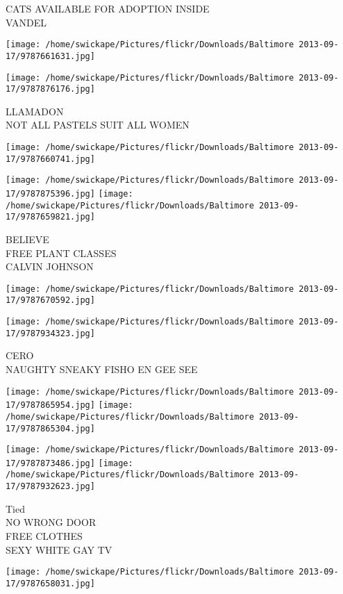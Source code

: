 \documentclass[10pt,letterpaper]{article}
\begin{document}
CATS AVAILABLE FOR ADOPTION INSIDE\\
VANDEL
\pagebreak

\texttt{[image: /home/swickape/Pictures/flickr/Downloads/Baltimore 2013-09-17/9787661631.jpg]}

\vspace{0.25in}
\texttt{[image: /home/swickape/Pictures/flickr/Downloads/Baltimore 2013-09-17/9787876176.jpg]}

LLAMADON\\
NOT ALL PASTELS SUIT ALL WOMEN
\pagebreak

\texttt{[image: /home/swickape/Pictures/flickr/Downloads/Baltimore 2013-09-17/9787660741.jpg]}

\vspace{0.25in}
\texttt{[image: /home/swickape/Pictures/flickr/Downloads/Baltimore 2013-09-17/9787875396.jpg]}
\texttt{[image: /home/swickape/Pictures/flickr/Downloads/Baltimore 2013-09-17/9787659821.jpg]}

BELIEVE\\
FREE PLANT CLASSES\\
CALVIN JOHNSON
\pagebreak

\texttt{[image: /home/swickape/Pictures/flickr/Downloads/Baltimore 2013-09-17/9787670592.jpg]}

\vspace{0.25in}
\texttt{[image: /home/swickape/Pictures/flickr/Downloads/Baltimore 2013-09-17/9787934323.jpg]}

CERO\\
NAUGHTY SNEAKY FISHO EN GEE SEE
\pagebreak

\texttt{[image: /home/swickape/Pictures/flickr/Downloads/Baltimore 2013-09-17/9787865954.jpg]}
\texttt{[image: /home/swickape/Pictures/flickr/Downloads/Baltimore 2013-09-17/9787865304.jpg]}

\texttt{[image: /home/swickape/Pictures/flickr/Downloads/Baltimore 2013-09-17/9787873486.jpg]}
\texttt{[image: /home/swickape/Pictures/flickr/Downloads/Baltimore 2013-09-17/9787932623.jpg]}

Tied\\
NO WRONG DOOR\\
FREE CLOTHES\\
SEXY WHITE GAY TV
\pagebreak

\texttt{[image: /home/swickape/Pictures/flickr/Downloads/Baltimore 2013-09-17/9787658031.jpg]}
\end{document}
